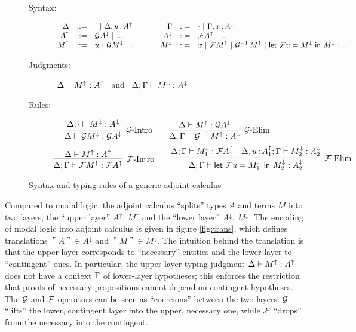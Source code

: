 \documentclass[11pt]{article}
\begin{document}
\begin{figure}[h]
  \begin{description}
    \item[Syntax:]
    \[\begin{array}{rclrcl}
      \Delta &::=& \cdot ~|~ \Delta, u \mathop{:} A^\uparrow &\qquad
      \Gamma &::=& \cdot ~|~ \Gamma, x \mathop{:} A^\downarrow \\
      {A^\uparrow} &::=& \mathcal{G} A^\downarrow ~|~ ... &\qquad
      A^\downarrow &::=& \mathcal{F} A^\uparrow ~|~ ...\\
      M^\uparrow &::=& u ~|~ \mathcal{G}{M^\downarrow} ~|~ ... &\qquad
      M^\downarrow &::=& x ~|~ \mathcal{F}{M^\uparrow} ~|~ \mathcal{G}^{-1}\,{M^\uparrow}
      ~|~ \textsf{let}~{\mathcal{F}{u}}={M^\downarrow}~\textsf{in}~{M^\downarrow}
      ~|~ ...\\
    \end{array}\]
  \item[Judgments:]\ $\Delta \vdash M^\uparrow : A^\uparrow$ \ and
    \ $\Delta;\Gamma \vdash M^\downarrow : A^\downarrow$
  \item[Rules:]
    \[
    \infer[\fG\text{-Intro}]{\D \ent \Gbox{M^\downarrow} \isa \fG A^\downarrow}{
      \D;\ecx \ent M^\downarrow \isa A^\downarrow}
    \qquad
    \infer[\fG\text{-Elim}]{\D;\G \ent \Ginv{M^\uparrow} \isa A^\downarrow}{
      \D \ent M^\uparrow \isa \fG A^\downarrow}
    \]
    \[
    \infer[\fF\text{-Intro}]{\D;\G \ent \Fbox{M^\uparrow} \isa \fF A^\uparrow}{
      \D \ent M^\uparrow \isa A^\uparrow}
    \qquad
    \infer[\fF\text{-Elim}]{
      \D;\G \ent \letF{u}{M_1^\downarrow}{M_2^\downarrow} \isa A_2^\downarrow
    }{
      \D;\G \ent M_1^\downarrow \isa \fF A_1^\uparrow &
      \D,u \of A_1^\uparrow;\G \ent M_2^\downarrow \isa A_2^\downarrow}
    \]
  \end{description}

  \caption{Syntax and typing rules of a generic adjoint calculus}
  \label{fig:adjoint}

\end{figure}

\newcommand{\trans}[1]{\ulcorner\!{#1}\!\urcorner}

Compared to modal logic, the adjoint calculus ``splits'' types $A$ and terms $M$
into two layers, the ``upper layer'' $A^\uparrow$, $M^\uparrow$ and the ``lower
layer'' $A^\downarrow$, $M^\downarrow$. The encoding of modal logic into adjoint
calculus is given in figure \ref{fig:trans}, which defines translations
$\trans{A} \in A^\downarrow$ and $\trans{M} \in M^\downarrow$. The intuition
behind the translation is that the upper layer corresponds to ``necessary''
entities and the lower layer to ``contingent'' ones. In particular, the
upper-layer typing judgment $\Delta \vdash M^\uparrow : A^\uparrow$ does not have a
context $\Gamma$ of lower-layer hypotheses; this enforces the restriction that
proofs of necessary propositions cannot depend on contingent hypotheses. The
$\mathcal{G}$ and $\mathcal{F}$ operators can be seen as ``coercions'' between the two layers.
$\mathcal{G}$ ``lifts'' the lower, contingent layer into the upper, necessary one, while
$\mathcal{F}$ ``drops'' from the necessary into the contingent.
\end{document}
